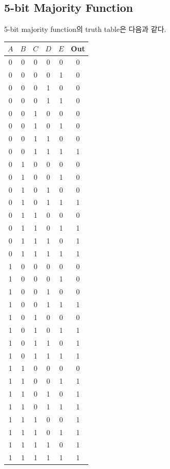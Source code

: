 \documentclass{scrartcl}
\begin{document}
\subsection{5-bit Majority Function}
5-bit majority function의 truth table은 다음과 같다.
\begin{table}[H]
  \centering
  \begin{tabular}{|ccccc|c|}
  \hline
  \(A\) & \(B\) & \(C\) & \(D\) & \(E\) & Out \\
  \hline
  0 & 0 & 0 & 0 & 0 & 0   \\
  0 & 0 & 0 & 0 & 1 & 0   \\
  0 & 0 & 0 & 1 & 0 & 0   \\
  0 & 0 & 0 & 1 & 1 & 0   \\
  0 & 0 & 1 & 0 & 0 & 0   \\
  0 & 0 & 1 & 0 & 1 & 0   \\
  0 & 0 & 1 & 1 & 0 & 0   \\
  0 & 0 & 1 & 1 & 1 & 1   \\
  0 & 1 & 0 & 0 & 0 & 0   \\
  0 & 1 & 0 & 0 & 1 & 0   \\
  0 & 1 & 0 & 1 & 0 & 0   \\
  0 & 1 & 0 & 1 & 1 & 1   \\
  0 & 1 & 1 & 0 & 0 & 0   \\
  0 & 1 & 1 & 0 & 1 & 1   \\
  0 & 1 & 1 & 1 & 0 & 1   \\
  0 & 1 & 1 & 1 & 1 & 1   \\
  1 & 0 & 0 & 0 & 0 & 0   \\
  1 & 0 & 0 & 0 & 1 & 0   \\
  1 & 0 & 0 & 1 & 0 & 0   \\
  1 & 0 & 0 & 1 & 1 & 1   \\
  1 & 0 & 1 & 0 & 0 & 0   \\
  1 & 0 & 1 & 0 & 1 & 1   \\
  1 & 0 & 1 & 1 & 0 & 1   \\
  1 & 0 & 1 & 1 & 1 & 1   \\
  1 & 1 & 0 & 0 & 0 & 0   \\
  1 & 1 & 0 & 0 & 1 & 1   \\
  1 & 1 & 0 & 1 & 0 & 1   \\
  1 & 1 & 0 & 1 & 1 & 1   \\
  1 & 1 & 1 & 0 & 0 & 1   \\
  1 & 1 & 1 & 0 & 1 & 1   \\
  1 & 1 & 1 & 1 & 0 & 1   \\
  1 & 1 & 1 & 1 & 1 & 1   \\
  \hline
  \end{tabular}
\end{table}
\end{document}
